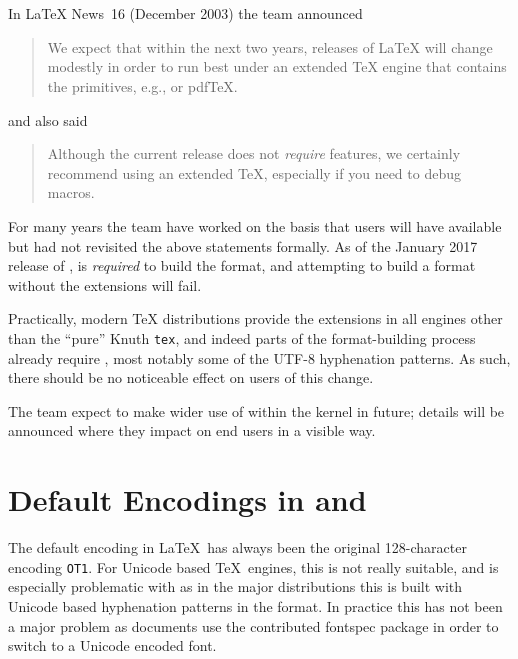 \documentclass{ltnews}
\begin{document}
\maketitle
\tableofcontents

\setlength{}
\section{\eTeX{}}

In \LaTeX{} News~16 (December 2003) the team announced
\begin{quotation}
We expect that within the next two years, releases of \LaTeX{} will
change modestly in order to run best under an extended \TeX{} engine
that contains the \eTeX{} primitives, e.g., \eTeX{} or pdf\TeX{}.
\end{quotation}
and also said
\begin{quotation}
Although the current release does not \emph{require} \eTeX{} features, we
certainly recommend using an extended \TeX{}, especially if you need to debug
macros.
\end{quotation}

For many years the team have worked on the basis that users will have \eTeX{}
available but had not revisited the above statements formally. As of the
January 2017 release of \LaTeXe{}, \eTeX{} is \emph{required} to build the
format, and attempting to build a format without the extensions will fail.

Practically, modern \TeX{} distributions provide the extensions in all engines
other than the ``pure'' Knuth \texttt{tex}, and indeed parts of the
format-building process already require \eTeX{}, most notably some of the UTF-8
hyphenation patterns. As such, there should be no noticeable effect on users of
this change.

The team expect to make wider use of \eTeX{} within the kernel in future;
details will be announced where they impact on end users in a visible way.

\section{Default Encodings in  and }
The default encoding in \LaTeX\ has always been the original
128-character encoding \texttt{OT1}.  For Unicode based \TeX\ engines, this
is not really suitable, and is especially problematic with
 as in the major distributions this is built with
Unicode based hyphenation patterns in the format.  In practice this has
not been a major problem as documents use the contributed
\textsf{fontspec} package in order to switch to a
Unicode encoded font.
\end{document}
